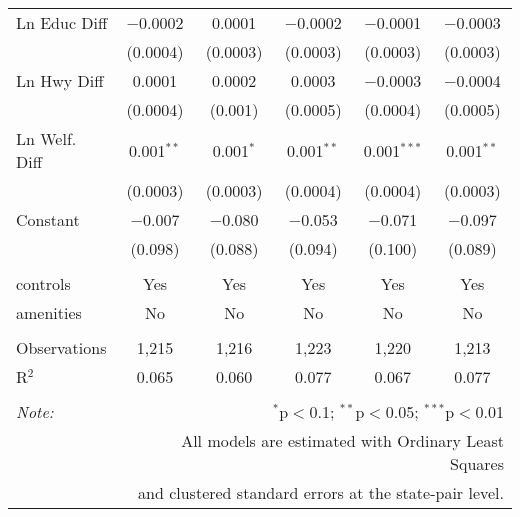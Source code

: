 \begin{table}[!htbp]
\begin{tabular}{@{\extracolsep{5pt}}lccccc}
  Ln Educ Diff & $-$0.0002 & 0.0001 & $-$0.0002 & $-$0.0001 & $-$0.0003 \\ 
  & (0.0004) & (0.0003) & (0.0003) & (0.0003) & (0.0003) \\ 
  Ln Hwy Diff & 0.0001 & 0.0002 & 0.0003 & $-$0.0003 & $-$0.0004 \\ 
  & (0.0004) & (0.001) & (0.0005) & (0.0004) & (0.0005) \\ 
  Ln Welf. Diff & 0.001$^{**}$ & 0.001$^{*}$ & 0.001$^{**}$ & 0.001$^{***}$ & 0.001$^{**}$ \\ 
  & (0.0003) & (0.0003) & (0.0004) & (0.0004) & (0.0003) \\ 
  Constant & $-$0.007 & $-$0.080 & $-$0.053 & $-$0.071 & $-$0.097 \\ 
  & (0.098) & (0.088) & (0.094) & (0.100) & (0.089) \\ 
 \hline \\[-1.8ex] 
controls & Yes & Yes & Yes & Yes & Yes \\ 
amenities & No & No & No & No & No \\ 
\hline \\[-1.8ex] 
Observations & 1,215 & 1,216 & 1,223 & 1,220 & 1,213 \\ 
R$^{2}$ & 0.065 & 0.060 & 0.077 & 0.067 & 0.077 \\ 
\hline 
\hline \\[-1.8ex] 
\textit{Note:}  & \multicolumn{5}{r}{$^{*}$p$<$0.1; $^{**}$p$<$0.05; $^{***}$p$<$0.01} \\ 
 & \multicolumn{5}{r}{All models are estimated with Ordinary Least Squares} \\ 
 & \multicolumn{5}{r}{and clustered standard errors at the state-pair level.} \\ 
\end{tabular} 
\end{table} 
